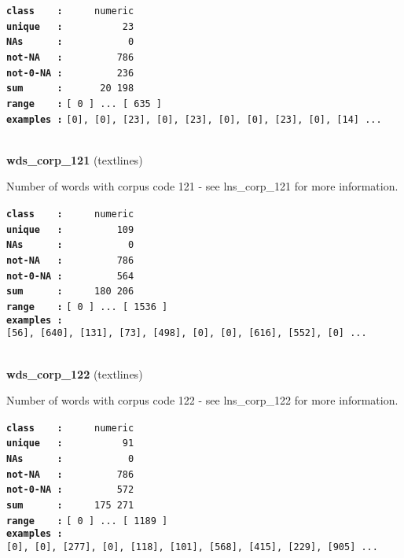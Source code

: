 \documentclass[]{article}
\begin{document}
\textbf{\texttt{class\ \ \ \ :}} \texttt{~~~~~numeric}\\
\textbf{\texttt{unique\ \ \ :}} \texttt{~~~~~~~~~~23}\\
\textbf{\texttt{NAs\ \ \ \ \ \ :}} \texttt{~~~~~~~~~~~0}\\
\textbf{\texttt{not-NA\ \ \ :}} \texttt{~~~~~~~~~786}\\
\textbf{\texttt{not-0-NA\ :}} \texttt{~~~~~~~~~236}\\
\textbf{\texttt{sum\ \ \ \ \ \ :}} \texttt{~~~~~~20~198}\\
\textbf{\texttt{range\ \ \ \ :}}
\texttt{{[}\ 0\ {]}\ ...\ {[}\ 635\ {]}}\\
\textbf{\texttt{examples\ :}}
\texttt{{[}0{]},\ {[}0{]},\ {[}23{]},\ {[}0{]},\ {[}23{]},\ {[}0{]},\ {[}0{]},\ {[}23{]},\ {[}0{]},\ {[}14{]}\ ...}\\

~

\textbf{wds\_corp\_121} (textlines)

Number of words with corpus code 121 - see lns\_corp\_121 for more
information.

\textbf{\texttt{class\ \ \ \ :}} \texttt{~~~~~numeric}\\
\textbf{\texttt{unique\ \ \ :}} \texttt{~~~~~~~~~109}\\
\textbf{\texttt{NAs\ \ \ \ \ \ :}} \texttt{~~~~~~~~~~~0}\\
\textbf{\texttt{not-NA\ \ \ :}} \texttt{~~~~~~~~~786}\\
\textbf{\texttt{not-0-NA\ :}} \texttt{~~~~~~~~~564}\\
\textbf{\texttt{sum\ \ \ \ \ \ :}} \texttt{~~~~~180~206}\\
\textbf{\texttt{range\ \ \ \ :}}
\texttt{{[}\ 0\ {]}\ ...\ {[}\ 1536\ {]}}\\
\textbf{\texttt{examples\ :}}
\texttt{{[}56{]},\ {[}640{]},\ {[}131{]},\ {[}73{]},\ {[}498{]},\ {[}0{]},\ {[}0{]},\ {[}616{]},\ {[}552{]},\ {[}0{]}\ ...}\\

~

\textbf{wds\_corp\_122} (textlines)

Number of words with corpus code 122 - see lns\_corp\_122 for more
information.

\textbf{\texttt{class\ \ \ \ :}} \texttt{~~~~~numeric}\\
\textbf{\texttt{unique\ \ \ :}} \texttt{~~~~~~~~~~91}\\
\textbf{\texttt{NAs\ \ \ \ \ \ :}} \texttt{~~~~~~~~~~~0}\\
\textbf{\texttt{not-NA\ \ \ :}} \texttt{~~~~~~~~~786}\\
\textbf{\texttt{not-0-NA\ :}} \texttt{~~~~~~~~~572}\\
\textbf{\texttt{sum\ \ \ \ \ \ :}} \texttt{~~~~~175~271}\\
\textbf{\texttt{range\ \ \ \ :}}
\texttt{{[}\ 0\ {]}\ ...\ {[}\ 1189\ {]}}\\
\textbf{\texttt{examples\ :}}
\texttt{{[}0{]},\ {[}0{]},\ {[}277{]},\ {[}0{]},\ {[}118{]},\ {[}101{]},\ {[}568{]},\ {[}415{]},\ {[}229{]},\ {[}905{]}\ ...}\\
\end{document}
